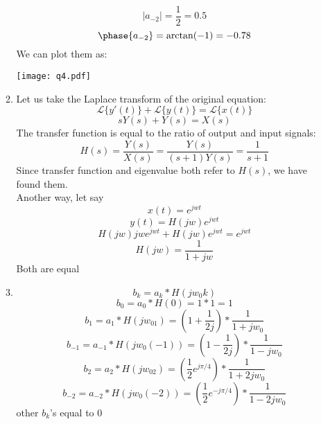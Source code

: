 \documentclass[10pt,a4paper, margin=1in]{article}
\begin{document}
\begin{enumerate}
\begin{enumerate}
    \begin{equation*}
        |a_{-2}| = \frac{1}{2} = 0.5
    \end{equation*}
    \begin{equation*}
        \phase{a_{-2}} = \arctan(-1) = -0.78
    \end{equation*}
 We can plot them as:
    \begin{center}
        \texttt{[image: q4.pdf]}
    \end{center}
    \item %
    Let us take the Laplace transform of the original equation:
    \begin{equation*}
        \mathscr{L}\{y'(t)\} + \mathscr{L}\{y(t)\} = \mathscr{L}\{x(t)\}
    \end{equation*}
    \begin{equation*}
        sY(s)+ Y(s) = X(s)
    \end{equation*}
    The transfer function is equal to the ratio of output and input signals:
\begin{equation}
    H(s) = \frac{Y(s)}{X(s)} = \frac{Y(s)}{(s+1)Y(s)} = \frac{1}{s+1}
\end{equation}
Since transfer function and eigenvalue both refer to $H(s)$, we have found them.\\
Another way, let say
\begin{equation}
    x(t) = e^{jwt}
\end{equation}
\begin{equation}
    y(t) = H(jw)e^{jwt}
\end{equation}
\begin{equation}
    H(jw)jwe^{jwt} + H(jw)e^{jwt} = e^{jwt}
\end{equation}
\begin{equation}
    H(jw) = \frac{1}{1 +jw}
\end{equation}
Both are equal
	\item %
 \begin{equation}
     b_k = a_k*H(jw_0k)
 \end{equation}
 \begin{equation}
     b_0 = a_0*H(0) = 1*1 = 1
 \end{equation}
 \begin{equation}
     b_1 = a_1*H(jw_01) = (1+\frac{1}{2j}) * \frac{1}{1+jw_0}
 \end{equation}
 \begin{equation}
     b_{-1} = a_{-1}*H(jw_0(-1)) = (1-\frac{1}{2j}) * \frac{1}{1-jw_0}
 \end{equation}
 \begin{equation}
     b_2 = a_2*H(jw_02) = (\frac{1}{2}e^{j\pi/4}) *\frac{1}{1+2jw_0}
 \end{equation}
  \begin{equation}
     b_{-2} = a_{-2}*H(jw_0(-2)) = (\frac{1}{2}e^{-j\pi/4}) *\frac{1}{1-2jw_0}
 \end{equation}
 other $b_k$'s equal to 0


\end{enumerate}
\end{enumerate}
\end{document}
